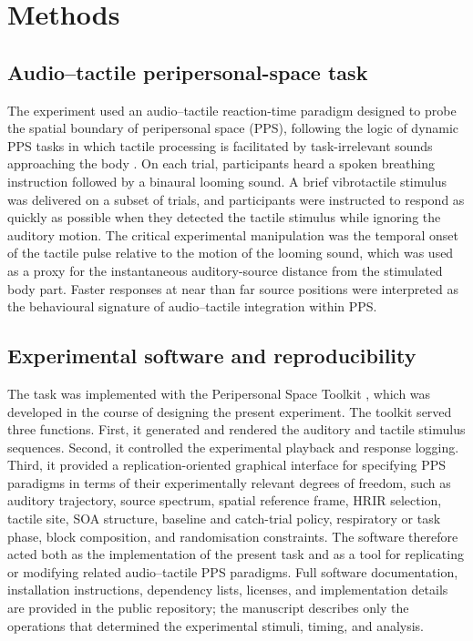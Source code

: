 
\section{Methods}

\subsection{Audio--tactile peripersonal-space task}

The experiment used an audio--tactile reaction-time paradigm designed to probe the
spatial boundary of peripersonal space (PPS), following the logic of dynamic
PPS tasks in which tactile processing is facilitated by task-irrelevant sounds
approaching the body \citep{Canzoneri2012DynamicSounds,Serino2015BodyPart}.
On each trial, participants heard a spoken breathing instruction followed by a
binaural looming sound. A brief vibrotactile stimulus was delivered on a subset
of trials, and participants were instructed to respond as quickly as possible
when they detected the tactile stimulus while ignoring the auditory motion. The
critical experimental manipulation was the temporal onset of the tactile pulse
relative to the motion of the looming sound, which was used as a proxy for the
instantaneous auditory-source distance from the stimulated body part. Faster
responses at near than far source positions were interpreted as the behavioural
signature of audio--tactile integration within PPS.

\subsection{Experimental software and reproducibility}

The task was implemented with the Peripersonal Space Toolkit
\citep{Fejer2026PPSToolkit}, which was developed in the course of designing
the present experiment. The toolkit served three functions. First, it generated
and rendered the auditory and tactile stimulus sequences. Second, it controlled
the experimental playback and response logging. Third, it provided a
replication-oriented graphical interface for specifying PPS paradigms in terms
of their experimentally relevant degrees of freedom, such as auditory
trajectory, source spectrum, spatial reference frame, HRIR selection, tactile
site, SOA structure, baseline and catch-trial policy, respiratory or task
phase, block composition, and randomisation constraints. The software therefore
acted both as the implementation of the present task and as a tool for
replicating or modifying related audio--tactile PPS paradigms. Full software
documentation, installation instructions, dependency lists, licenses, and
implementation details are provided in the public repository; the manuscript
describes only the operations that determined the experimental stimuli,
timing, and analysis.

